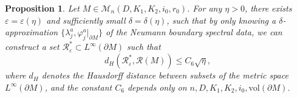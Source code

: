 \documentclass[11pt,letterpaper]{amsart}
\numberwithin{equation}{section}
\theoremstyle{definition}
\theoremstyle{plain}
\theoremstyle{definition}
\theoremstyle{plain}
\newtheorem{approximation}[volume]{Proposition}
\theoremstyle{definition}
\theoremstyle{plain}
\newcommand{\vol}{\textrm{vol}}
\begin{document}
\begin{approximation}\label{approximation}
Let $M\in \mathcal{M}_n(D,K_1,K_2,i_0,r_0)$. For any $\eta>0$, there exists $\varepsilon=\varepsilon(\eta)$ and sufficiently small $\delta=\delta(\eta)$, such that by only knowing a $\delta$-approximation $\{\lambda^a_j,\varphi^a_j|_{\partial M}\}$ of the Neumann boundary spectral data, we can construct a set $\mathcal{R}^{\ast}_{\varepsilon}\subset L^{\infty}(\partial M)$ such that
$$d_H (\mathcal{R}^{\ast}_{\varepsilon},\mathcal{R}(M)) \leqslant C_6\sqrt{\eta},$$
where $d_H$ denotes the Hausdorff distance between subsets of the metric space $L^{\infty}(\partial M)$, and the constant $C_6$ depends only on $n,D,K_1,K_2,i_0,\vol(\partial M)$.
\end{approximation}
\end{document}
